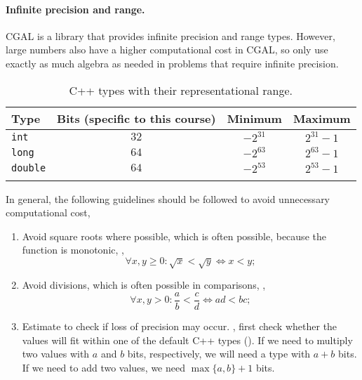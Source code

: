 \documentclass[justified,nobib]{tufte-handout}
\begin{document}
\paragraph{Infinite precision and range.}

CGAL is a library that provides infinite precision and range types. However, large numbers also have a higher computational
cost in CGAL, so only use exactly as much algebra as needed in problems that require infinite
precision.

\begin{table}[h]
    \centering
    \caption{C++ types with their representational range.}
    \label{tab:types}
    \begin{tabular}{lccc} \toprule
        Type            & Bits (specific to this course) & Minimum   & Maximum    \\
        \midrule
        \texttt{int}    & $32$                           & $-2^{31}$ & $2^{31}-1$ \\
        \texttt{long}   & $64$                           & $-2^{63}$ & $2^{63}-1$ \\
        \texttt{double} & $64$                           & $-2^{53}$ & $2^{53}-1$ \\
        \bottomrule                                                               \\
    \end{tabular}
\end{table}

In general, the following guidelines should be followed to avoid unnecessary computational cost,
\begin{enumerate}
    \item Avoid square roots where possible, which is often possible, because the function is monotonic,
          \ie, \[
              \forall x,y \geq 0 : \sqrt{x} < \sqrt{y} \iff x < y
              ;\]
    \item Avoid divisions, which is often possible in comparisons, \ie, \[
              \forall x,y > 0 : \frac{a}{b} < \frac{c}{d} \iff ad < bc
              ;\]
    \item Estimate to check if loss of precision may occur. \Ie, first check whether the values will fit
          within one of the default C++ types (). If we need to multiply two values with $a$
          and $b$ bits, respectively, we will need a type with $a+b$ bits. If we need to add two values, we
          need $\max\{a,b\}+1$ bits.
\end{enumerate}
\end{document}
